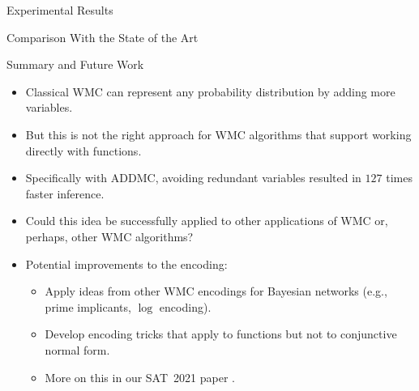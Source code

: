 \documentclass{beamer}
\begin{document}
\begin{frame}{Experimental Results}
  \centering
  
\end{frame}

%   

\begin{frame}{Comparison With the State of the Art}
  \centering
  
\end{frame}

\begin{frame}{Summary and Future Work}
  \begin{itemize}
  \item Classical WMC can represent any probability distribution by adding more
    variables.
  \item But this is not the right approach for WMC algorithms that support
    working directly with functions.
  \item Specifically with ADDMC, avoiding redundant variables resulted in
    \alert{$127$} times faster inference.
  \item Could this idea be successfully applied to other applications of WMC or,
    perhaps, other WMC algorithms?
  \end{itemize}
  \begin{itemize}
  \item Potential improvements to the encoding:
    \begin{itemize}
    \item Apply ideas from other WMC encodings for Bayesian networks (e.g.,
      prime implicants, $\log$ encoding).
    \item Develop encoding tricks that apply to functions but not to conjunctive
      normal form.
    \item More on this in our SAT~2021 paper \emph{}.
    \end{itemize}
  \end{itemize}
\end{frame}
\end{document}
